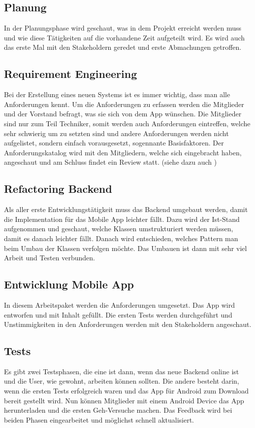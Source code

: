 \subsection{Planung}\label{planung}
In der Planungsphase wird geschaut, was in dem Projekt erreicht werden muss und wie diese Tätigkeiten auf die vorhandene Zeit aufgeteilt wird. Es wird auch das erste Mal mit den Stakeholdern geredet und erste Abmachungen getroffen.

\subsection{Requirement Engineering}\label{rqe}
Bei der Erstellung eines neuen Systems ist es immer wichtig, dass man alle Anforderungen kennt. Um die Anforderungen zu erfassen werden die Mitglieder und der Vorstand befragt, was sie sich von dem App wünschen. Die Mitglieder sind nur zum Teil Techniker, somit werden auch Anforderungen eintreffen, welche sehr schwierig um zu setzten sind und andere Anforderungen werden nicht aufgelistet, sondern einfach vorausgesetzt, sogennante Basisfaktoren. Der Anforderungskatalog wird mit den Mitgliedern, welche sich eingebracht haben, angeschaut und am Schluss findet ein Review statt. (siehe dazu auch \cite{req_eng_book})

\subsection{Refactoring Backend}\label{ref_backend}
Als aller erste Entwicklungstätigkeit muss das Backend umgebaut werden, damit die Implementation für das Mobile App leichter fällt. Dazu wird der Ist-Stand aufgenommen und geschaut, welche Klassen umstrukturiert werden müssen, damit es danach leichter fällt. Danach wird entschieden, welches Pattern man beim Umbau der Klassen verfolgen möchte. Das Umbauen ist dann mit sehr viel Arbeit und Testen verbunden.

\subsection{Entwicklung Mobile App}\label{eng_app}
In diesem Arbeitspaket werden die Anforderungen umgesetzt. Das App wird entworfen und mit Inhalt gefüllt. Die ersten Tests werden durchgeführt und Unstimmigkeiten in den Anforderungen werden mit den Stakeholdern angeschaut.

\subsection{Tests}\label{tests}
Es gibt zwei Testsphasen, die eine ist dann, wenn das neue Backend online ist und die User, wie gewohnt, arbeiten können sollten. Die andere besteht darin, wenn die ersten Tests erfolgreich waren und das App für Android zum Download bereit gestellt wird. Nun können Mitglieder mit einem Android Device das App herunterladen und die ersten Geh-Versuche machen. Das Feedback wird bei beiden Phasen eingearbeitet und möglichst schnell aktualisiert.

